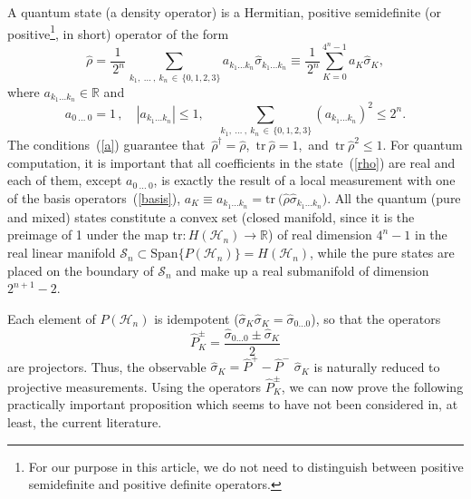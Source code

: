 \documentclass[12pt,a4paper,twoside]{article}      %
\begin{document}
A quantum state (a density operator) is a Hermitian, positive semidefinite (or positive\footnote{For our purpose in this article, we do not need to distinguish between positive semidefinite and positive definite operators.}, in short) operator of the form
\begin{equation}\label{rho}
\hat{\rho}= \frac{1}{\,2^n} \sum\limits_{\,k_1,\:\!\ldots\:\!,\:\!k_n\,\in\, \{0,1,2,3\}} a_{k_1\ldots{}k_n} \hat{\sigma}_{k_1\ldots{}k_n}
\equiv \frac{1}{\,2^n}
\sum\limits_{K=0}^{4^n-1} a_{K} \hat{\sigma}_{K},
\end{equation}
where $a_{k_1\ldots{}k_n}\in\mathbb{R}$ and
\begin{equation}\label{a}
a_{0\:\!\ldots\:\!0}=1\,, \quad |a_{k_1\ldots{}k_n}|\leqslant1, \quad \sum\limits_{\,k_1,\:\!\ldots\:\!,\:\!k_n\,\in\, \{0,1,2,3\}} (a_{k_1\ldots{}k_n})^2\leqslant 2^n.
\end{equation}
The conditions~(\ref{a}) guarantee that\, $\hat{\rho}^\dag=\hat{\rho}$,\, $\mathrm{tr}\:\!\hat{\rho}=1$,\, and\, $\mathrm{tr}\:\!\hat{\rho}^2\leqslant1$. For quantum computation, it is important that all coefficients in the state~(\ref{rho}) are real and each of them, except $a_{0\:\!\ldots\:\!0}$, is exactly the result of a local measurement with one of the basis operators~(\ref{basis}), $a_K\equiv{}a_{k_1\ldots{}k_n}= \mathrm{tr}\:\! \big(\hat{\rho}\hat{\sigma}_{k_1\ldots{}k_n}\big)$. All the quantum (pure and mixed) states constitute a convex set (closed manifold, since it is the preimage of 1 under the map $\mathrm{tr}: H(\mathcal{H}_n)\rightarrow\mathbb{R}$) of real dimension $4^n-1$ in the real linear manifold $\mathcal{S}_n\subset \mathrm{Span}\{P(\mathcal{H}_n)\}= H(\mathcal{H}_n)$, while the pure states are placed on the boundary of $\mathcal{S}_n$ and make up a real submanifold of dimension $2^{n+1}-2$.

Each element of $P(\mathcal{H}_n)$ is idempotent ($\hat{\sigma}_K\hat{\sigma}_K=\hat{\sigma}_{0\ldots0}$), so that the operators
\begin{equation}\label{P-pm-K}
\hat{P}^{\pm}_{K}= \frac{\hat{\sigma}_{0\ldots0}\pm\hat{\sigma}_K}{2}
\nonumber
\end{equation}
are projectors. Thus,  the observable $\hat{\sigma}_K= \hat{P}^+-\hat{P}^-$ $\hat{\sigma}_K$ is naturally reduced to projective measurements. Using the operators $\hat{P}^{\pm}_{K}$, we can now prove the following practically important proposition which seems to have not been considered in, at least, the current literature.
\end{document}
